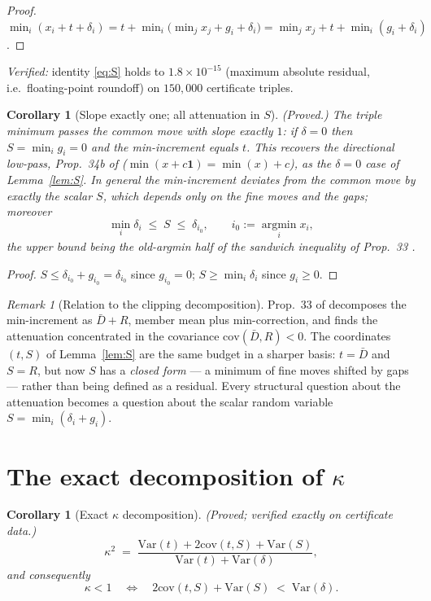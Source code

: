 \documentclass[11pt]{article}
\newtheorem{corollary}[theorem]{Corollary}
\theoremstyle{definition}
\theoremstyle{remark}
\newtheorem{remark}[theorem]{Remark}
\newcommand{\Var}{\mathrm{Var}}
\newcommand{\cov}{\mathrm{cov}}
\newcommand{\kap}{\kappa}
\newcommand{\dl}{\delta}
\begin{document}
\begin{proof}
$\min_i (x_i + t + \dl_i)
= t + \min_i \big( \min_j x_j + g_i + \dl_i \big)
= \min_j x_j + t + \min_i (g_i + \dl_i)$.
\end{proof}

\emph{Verified:} identity \eqref{eq:S} holds to $1.8 \times 10^{-15}$
(maximum absolute residual, i.e.\ floating-point roundoff) on $150{,}000$
certificate triples.

\begin{corollary}[Slope exactly one; all attenuation in $S$]
\label{cor:slope}
\textup{(Proved.)}
The triple minimum passes the common move with slope exactly $1$: if
$\dl = 0$ then $S = \min_i g_i = 0$ and the min-increment equals $t$.
This recovers the directional low-pass, Prop.~34b of \cite{NOTE}
($\min(x + c\mathbf{1}) = \min(x) + c$), as the $\dl = 0$ case of
Lemma~\ref{lem:S}. In general the min-increment deviates from the common
move by exactly the scalar $S$, which depends only on the fine moves and
the gaps; moreover
\[
\min_i \dl_i \;\leq\; S \;\leq\; \dl_{i_0},
\qquad i_0 := \operatorname*{argmin}_i x_i ,
\]
the upper bound being the old-argmin half of the sandwich inequality of
Prop.~33 \cite{NOTE}.
\end{corollary}

\begin{proof}
$S \leq \dl_{i_0} + g_{i_0} = \dl_{i_0}$ since $g_{i_0} = 0$;
$S \geq \min_i \dl_i$ since $g_i \geq 0$.
\end{proof}

\begin{remark}[Relation to the clipping decomposition]
Prop.~33 of \cite{NOTE} decomposes the min-increment
as $\bar D + R$, member mean plus min-correction, and finds the
attenuation concentrated in the covariance $\cov(\bar D, R) < 0$. The coordinates $(t, S)$ of
Lemma~\ref{lem:S} are the same budget in a sharper basis: $t = \bar D$
and $S = R$, but now $S$ has a \emph{closed form} --- a minimum of fine
moves shifted by gaps --- rather than being defined as a residual. Every
structural question about the attenuation becomes a question about the
scalar random variable $S = \min_i(\dl_i + g_i)$.
\end{remark}

\section{The exact decomposition of $\kap$}
\label{sec:decomp}

\begin{corollary}[Exact $\kap$ decomposition]
\label{cor:decomp}
\textup{(Proved; verified exactly on certificate data.)}
\begin{equation}
\kap^2 \;=\;
\frac{\Var(t) + 2\cov(t,S) + \Var(S)}{\Var(t) + \Var(\dl)} ,
\label{eq:decomp}
\end{equation}
and consequently
\begin{equation}
\kap < 1
\quad\Longleftrightarrow\quad
2\cov(t,S) + \Var(S) \;<\; \Var(\dl) .
\label{eq:criterion}
\end{equation}
\end{corollary}
\end{document}
